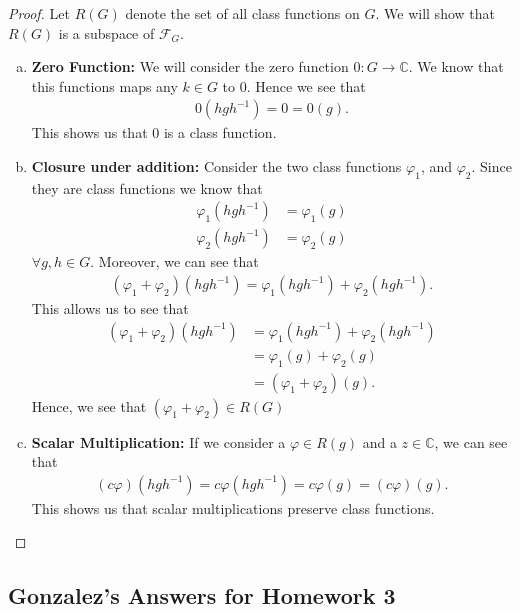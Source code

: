 \documentclass[titlepage]{article}
\theoremstyle{plain}
\theoremstyle{definition}
\theoremstyle{remark}
\theoremstyle{exercise-style}
\numberwithin{equation}{section}
\numberwithin{theorem}{section}
\numberwithin{remark}{section}
\begin{document}
\begin{proof}
    Let $R(G)$ denote the set of all class functions on $G$. We will show that $R(G)$ is a subspace of $\mathcal{F}_G$.
    \begin{enumerate}[(a)]
        \item \textbf{Zero Function:} We will consider the zero function $0 : G \to \mathbb C$. We know that this functions maps any $k \in G$ to $0$. Hence we see that
        \begin{align}
            0(h g h^{-1}) = 0 = 0(g).
        \end{align}
        This shows us that $0$ is a class function.
        \item \textbf{Closure under addition:} Consider the two class functions $\varphi_1$, and $\varphi_2$. Since they are class functions we know that 
        \begin{align}
            \varphi_1(hgh^{-1}) &= \varphi_1(g) \\
            \varphi_2(hgh^{-1}) &= \varphi_2(g)
        \end{align}
        $\forall g,h \in G$. Moreover, we can see that 
        \begin{align}
            (\varphi_1 + \varphi_2)(hgh^{-1}) = \varphi_1(hgh^{-1}) + \varphi_2(hgh^{-1}).
        \end{align}
        This allows us to see that
        \begin{align}
            (\varphi_1 + \varphi_2)(hgh^{-1}) &= \varphi_1(hgh^{-1}) + \varphi_2(hgh^{-1}) \\
            &= \varphi_1(g) + \varphi_2(g) \\
            &= (\varphi_1 + \varphi_2)(g).
        \end{align}
        Hence, we see that $(\varphi_1 + \varphi_2) \in R(G)$
        \item \textbf{Scalar Multiplication:} If we consider a $\varphi \in R(g)$ and a $z \in \mathbb C$, we can see that
        \begin{align}
            (c\varphi)(hgh^{-1}) = c\varphi(hgh^{-1})  =c \varphi(g) = (c\varphi)(g).
        \end{align}
        This shows us that scalar multiplications preserve class functions.
    \end{enumerate}
\end{proof}

\subsection{Gonzalez's Answers for Homework 3}
\end{document}
